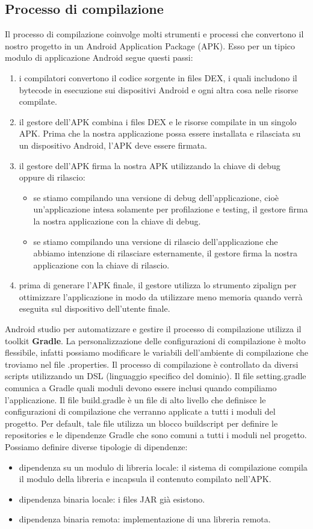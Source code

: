 \subsection{Processo di compilazione}
Il processo di compilazione coinvolge molti strumenti e processi che convertono il nostro progetto in un Android Application Package (APK). Esso per un tipico modulo di applicazione Android segue questi passi:
\begin{enumerate}
\item i compilatori convertono il codice sorgente in files DEX, i quali includono il bytecode in esecuzione sui dispositivi Android e ogni altra cosa nelle risorse compilate.
\item il gestore dell'APK combina i files DEX e le risorse compilate in un singolo APK. Prima che la nostra applicazione possa essere installata e rilasciata su un dispositivo Android, l'APK deve essere firmata.
\item il gestore dell'APK firma la nostra APK utilizzando la chiave di debug oppure di rilascio:
\begin{itemize}
\item se stiamo compilando una versione di debug dell'applicazione, cioè un'applicazione intesa solamente per profilazione e testing, il gestore firma la nostra applicazione con la chiave di debug.
\item se stiamo compilando una versione di rilascio dell'applicazione che abbiamo intenzione di rilasciare esternamente, il gestore firma la nostra applicazione con la chiave di rilascio.
\end{itemize}
\item prima di generare l'APK finale, il gestore utilizza lo strumento zipalign per ottimizzare l'applicazione in modo da utilizzare meno memoria quando verrà eseguita sul dispositivo dell'utente finale.
\end{enumerate}
Android studio per automatizzare e gestire il processo di compilazione utilizza il toolkit \textbf{Gradle}. La personalizzazione delle configurazioni di compilazione è molto flessibile, infatti possiamo modificare le variabili dell'ambiente di compilazione che troviamo nel file .properties. Il processo di compilazione è controllato da diversi scripts utilizzando un DSL (linguaggio specifico del dominio). Il file setting.gradle comunica a Gradle quali moduli devono essere inclusi quando compiliamo l'applicazione. Il file build.gradle è un file di alto livello che definisce le configurazioni di compilazione che verranno applicate a tutti i moduli del progetto. Per default, tale file utilizza un blocco buildscript per definire le repositories e le dipendenze Gradle che sono comuni a tutti i moduli nel progetto. Possiamo definire diverse tipologie di dipendenze:
\begin{itemize}
\item dipendenza su un modulo di libreria locale: il sistema di compilazione compila il modulo della libreria e incapsula il contenuto compilato nell'APK.
\item dipendenza binaria locale: i files JAR già esistono.
\item dipendenza binaria remota: implementazione di una libreria remota.
\end{itemize}
